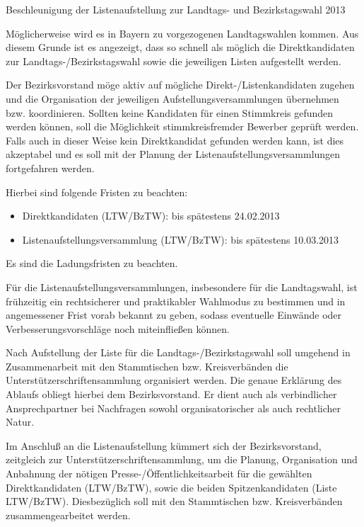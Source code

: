 \documentclass{protokoll}
\begin{document}
\begin{Antrag}
        {Beschleunigung der Listenaufstellung zur Landtags- und Bezirkstagswahl 2013}
        {}


\begin{Text}
Möglicherweise wird es in Bayern zu vorgezogenen Landtagswahlen
kommen. Aus diesem Grunde ist es angezeigt, dass so schnell als
möglich die Direktkandidaten zur Landtags-/Bezirkstagswahl sowie die
jeweiligen Listen aufgestellt werden.

Der Bezirksvorstand möge aktiv auf mögliche Direkt-/Listenkandidaten
zugehen und die Organisation der jeweiligen Aufstellungsversammlungen
übernehmen bzw. koordinieren. Sollten keine Kandidaten für einen
Stimmkreis gefunden werden können, soll die Möglichkeit
stimmkreisfremder Bewerber geprüft werden. Falls auch in dieser Weise
kein Direktkandidat gefunden werden kann, ist dies akzeptabel und es
soll mit der Planung der Listenaufstellungsversammlungen fortgefahren
werden.

Hierbei sind folgende Fristen zu beachten:
\begin{itemize}
\item Direktkandidaten (LTW/BzTW): bis spätestens 24.02.2013
\item Listenaufstellungsversammlung (LTW/BzTW): bis spätestens 10.03.2013
\end{itemize}

Es sind die Ladungsfristen zu beachten.

Für die Listenaufstellungsversammlungen, insbesondere für die
Landtagswahl, ist frühzeitig ein rechtsicherer und praktikabler
Wahlmodus zu bestimmen und in angemessener Frist vorab bekannt zu
geben, sodass eventuelle Einwände oder Verbesserungsvorschläge noch
miteinfließen können.

Nach Aufstellung der Liste für die Landtags-/Bezirkstagswahl soll
umgehend in Zusammenarbeit mit den Stammtischen bzw. Kreisverbänden
die Unterstützerschriftensammlung organisiert werden. Die genaue
Erklärung des Ablaufs obliegt hierbei dem Bezirksvorstand. Er dient
auch als verbindlicher Ansprechpartner bei Nachfragen sowohl
organisatorischer als auch rechtlicher Natur.

Im Anschluß an die Listenaufstellung kümmert sich der Bezirksvorstand,
zeitgleich zur Unterstützerschriftensammlung, um die Planung,
Organisation und Anbahnung der nötigen Presse-/Öffentlichkeitsarbeit
für die gewählten Direktkandidaten (LTW/BzTW), sowie die beiden
Spitzenkandidaten (Liste LTW/BzTW). Diesbezüglich soll mit den
Stammtischen bzw. Kreisverbänden zusammengearbeitet werden.
\end{Text}


\end{Antrag}
\end{document}
